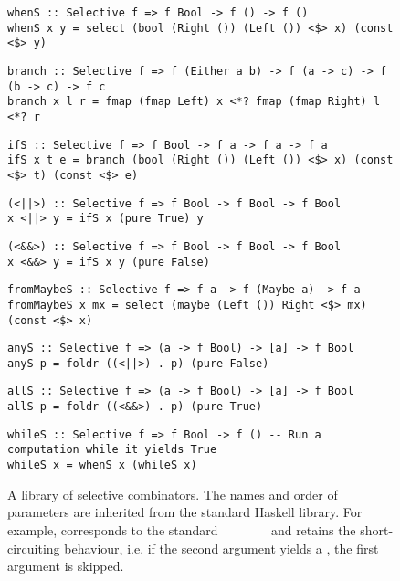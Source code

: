 {\begin{figure}
\begin{verbatim}
whenS :: Selective f => f Bool -> f () -> f ()
whenS x y = select (bool (Right ()) (Left ()) <$> x) (const <$> y)
\end{verbatim}
\vspace{1mm}
\begin{verbatim}
branch :: Selective f => f (Either a b) -> f (a -> c) -> f (b -> c) -> f c
branch x l r = fmap (fmap Left) x <*? fmap (fmap Right) l <*? r
\end{verbatim}
\vspace{1mm}
\begin{verbatim}
ifS :: Selective f => f Bool -> f a -> f a -> f a
ifS x t e = branch (bool (Right ()) (Left ()) <$> x) (const <$> t) (const <$> e)
\end{verbatim}
\vspace{1mm}
\begin{verbatim}
(<||>) :: Selective f => f Bool -> f Bool -> f Bool
x <||> y = ifS x (pure True) y
\end{verbatim}
\vspace{1mm}
\begin{verbatim}
(<&&>) :: Selective f => f Bool -> f Bool -> f Bool
x <&&> y = ifS x y (pure False)
\end{verbatim}
\vspace{1mm}
\begin{verbatim}
fromMaybeS :: Selective f => f a -> f (Maybe a) -> f a
fromMaybeS x mx = select (maybe (Left ()) Right <$> mx) (const <$> x)
\end{verbatim}
\vspace{1mm}
\begin{verbatim}
anyS :: Selective f => (a -> f Bool) -> [a] -> f Bool
anyS p = foldr ((<||>) . p) (pure False)
\end{verbatim}
\vspace{1mm}
\begin{verbatim}
allS :: Selective f => (a -> f Bool) -> [a] -> f Bool
allS p = foldr ((<&&>) . p) (pure True)
\end{verbatim}
\vspace{1mm}
\begin{verbatim}
whileS :: Selective f => f Bool -> f () -- Run a computation while it yields True
whileS x = whenS x (whileS x)
\end{verbatim}
\vspace{-2mm}
\caption{A library of selective combinators. The names and order of parameters
are inherited from the standard Haskell library. For example, 
corresponds to the standard
~\hs{::}~~\hs{->}~~~\hs{->}~ and
retains the short-circuiting behaviour, i.e. if the second argument yields a
, the first argument is skipped.}
\label{fig-library}
\vspace{-3mm}
\end{figure}

}
